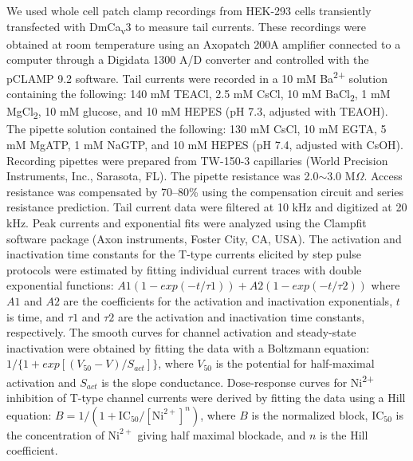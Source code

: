 We used whole cell patch clamp recordings from HEK-293 cells transiently transfected with DmCa\textsubscript{v}3 to measure tail currents. 
These recordings were obtained at room temperature using an Axopatch 200A amplifier connected to a computer through a Digidata 1300 A/D converter and controlled with the pCLAMP 9.2 software.
Tail currents were recorded in a 10 mM Ba\textsuperscript{2+} solution containing the following: 140 mM TEACl, 2.5 mM CsCl, 10 mM BaCl\textsubscript{2}, 1 mM MgCl\textsubscript{2}, 10 mM glucose, and 10 mM HEPES (pH 7.3, adjusted with TEAOH).
The pipette solution contained the following: 130 mM CsCl, 10 mM EGTA, 5 mM MgATP, 1 mM NaGTP, and 10 mM HEPES (pH 7.4, adjusted with CsOH). 
Recording pipettes were prepared from TW-150-3 capillaries (World Precision Instruments, Inc., Sarasota, FL).
The pipette resistance was 2.0$\sim$3.0 M$\Omega$.
Access resistance was compensated by 70--80\% using the compensation circuit and series resistance prediction.
Tail current data were filtered at 10 kHz and digitized at 20 kHz.
Peak currents and exponential fits were analyzed using the Clampfit software package (Axon instruments, Foster City, CA, USA).
The activation and inactivation time constants for the T-type currents elicited by step pulse protocols were estimated by fitting individual current traces with double exponential functions: $A1(1-exp(-t/\tau1)) + A2(1-exp(-t/\tau2))$ where $A1$ and $A2$ are the coefficients for the activation and inactivation exponentials, $t$ is time, and $\tau1$ and $\tau2$ are the activation and inactivation time constants, respectively.
The smooth curves for channel activation and steady-state inactivation were obtained by fitting the data with a Boltzmann equation: $1/\{1+exp[(V_{50}-V)/S_{act}]\}$, where $V_{50}$ is the potential for half-maximal activation and $S_{act}$ is the slope conductance.
Dose-response curves for Ni\textsuperscript{2+} inhibition of T-type channel currents were derived by fitting the data using a Hill equation: $B = 1/(1 + \textrm{IC}_{50}/[\textrm{Ni}^{2+}]^n)$, where $B$ is the normalized block, $\textrm{IC}_{50}$ is the concentration of $\textrm{Ni}^{2+}$ giving half maximal blockade, and $n$ is the Hill coefficient.
